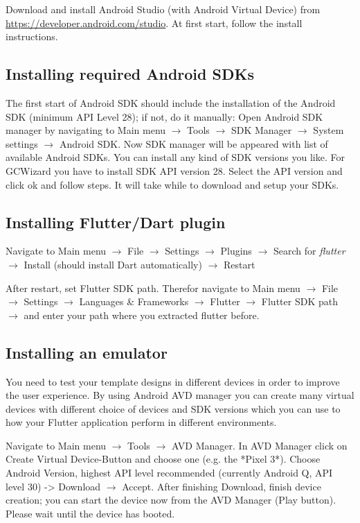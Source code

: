 Download and install Android Studio (with Android Virtual Device) from \url{https://developer.android.com/studio}. At first start, follow the install instructions. 

\subsection{Installing required Android SDKs}
The first start of Android SDK should include the installation of the Android SDK (minimum API Level 28); if not, do it manually: \newline
Open Android SDK manager by navigating to Main menu $\rightarrow$ Tools $\rightarrow$ SDK Manager $\rightarrow$ System settings $\rightarrow$ Android SDK.
Now SDK manager will be appeared with list of available Android SDKs. You can install any kind of SDK versions you like. For GCWizard you have to install SDK API version 28. Select the API version and click ok and follow steps. It will take while to download and setup your SDKs.

\subsection{Installing Flutter/Dart plugin}
Navigate to Main menu $\rightarrow$ File $\rightarrow$ Settings $\rightarrow$ Plugins $\rightarrow$ Search for \emph{flutter} $\rightarrow$ Install (should install Dart automatically) $\rightarrow$ Restart\par

After restart, set Flutter SDK path. Therefor navigate to Main menu $\rightarrow$ File $\rightarrow$ Settings $\rightarrow$ Languages \& Frameworks $\rightarrow$ Flutter $\rightarrow$ Flutter SDK path $\rightarrow$ and enter your path where you extracted flutter before.

\subsection{Installing an emulator}
You need to test your template designs in different devices in order to improve the user experience. By using Android AVD manager you can create many virtual devices with different choice of devices and SDK versions which you can use to how your Flutter application perform in different environments.\par

Navigate to Main menu $\rightarrow$ Tools $\rightarrow$ AVD Manager. In AVD Manager click on Create Virtual Device-Button and choose one (e.g. the *Pixel 3*).
Choose Android Version, highest API level recommended (currently Android Q, API level 30) -> Download $\rightarrow$ Accept.
After finishing Download, finish device creation; you can start the device now from the AVD Manager (Play button). Please wait until the device has booted.


